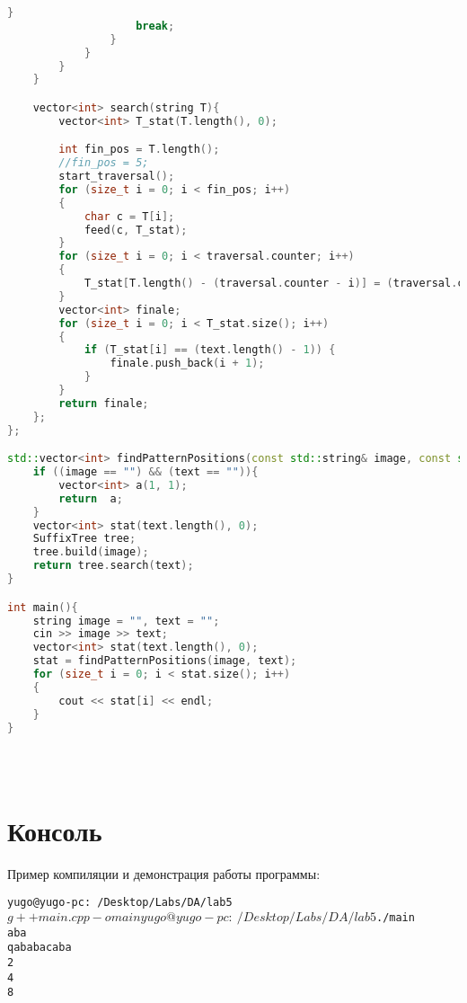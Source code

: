 \begin{lstlisting}[language=C++]
                    }
                    break;
                }
            }
        }
    }

    vector<int> search(string T){
        vector<int> T_stat(T.length(), 0); 

        int fin_pos = T.length();
        //fin_pos = 5;
        start_traversal();
        for (size_t i = 0; i < fin_pos; i++)
        {
            char c = T[i];
            feed(c, T_stat);
        }
        for (size_t i = 0; i < traversal.counter; i++)
        {
            T_stat[T.length() - (traversal.counter - i)] = (traversal.counter - i);
        }
        vector<int> finale;
        for (size_t i = 0; i < T_stat.size(); i++)
        {
            if (T_stat[i] == (text.length() - 1)) {
                finale.push_back(i + 1);
            }
        }
        return finale;
    };
};

std::vector<int> findPatternPositions(const std::string& image, const std::string& text) {
    if ((image == "") && (text == "")){
        vector<int> a(1, 1);
        return  a;
    }
    vector<int> stat(text.length(), 0);
    SuffixTree tree;
    tree.build(image);
    return tree.search(text);
}

int main(){
    string image = "", text = "";
    cin >> image >> text;
    vector<int> stat(text.length(), 0);
    stat = findPatternPositions(image, text);
    for (size_t i = 0; i < stat.size(); i++)
    {
        cout << stat[i] << endl;
    }
}


	
\end{lstlisting}

\section{Консоль}
Пример компиляции и демонстрация работы программы:
\begin{alltt}
yugo@yugo-pc:~/Desktop/Labs/DA/lab 5$ g++ main.cpp -o main
yugo@yugo-pc:~/Desktop/Labs/DA/lab 5$ ./main
aba
qababacaba
2
4
8
\end{alltt}

